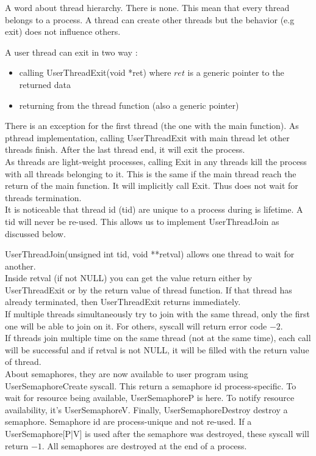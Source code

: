 A word about thread hierarchy. There is none. This mean that every thread
belongs to a process. A thread can create other threads but the behavior (e.g
exit) does not influence others.

A user thread can exit in two way :
\begin{itemize}
    \item calling \textrm{UserThreadExit(void *ret)} where $ret$ is a generic
        pointer to the returned data
    \item returning from the thread function (also a generic pointer)
\end{itemize}

There is an exception for the first thread (the one with the main function). As
pthread implementation, calling \textrm{UserThreadExit} with main thread let
other threads finish. After the last thread end, it will exit the process.\\

As threads are light-weight processes, calling \textrm{Exit} in any threads
kill the process with all threads belonging to it. This is the same if the main
thread reach the return of the main function. It will implicitly call
\textrm{Exit}. Thus does not wait for threads termination.\\

It is noticeable that thread id (tid) are unique to a process during is
lifetime. A tid will never be re-used. This allows us to implement
\textrm{UserThreadJoin} as discussed below.

\textrm{UserThreadJoin(unsigned int tid, void **retval)} allows one thread to wait for
another.\\
Inside retval (if not NULL) you can get the value return either by
\textrm{UserThreadExit} or by the return value of thread function. If that
thread has already terminated, then \textrm{UserThreadExit} returns
immediately.\\
If multiple threads simultaneously try to join with the same thread, only the
first one will be able to join on it. For others, syscall will return error
code $-2$. \\
If threads join multiple time on the same thread (not at the same time), each
call will be successful and if retval is not NULL, it will be filled with the
return value of thread.\\

About semaphores, they are now available to user program using
UserSemaphoreCreate syscall. This return a semaphore id process-specific. To
wait for resource being available, \textrm{UserSemaphoreP} is here. To notify resource
availability, it's\textrm{ UserSemaphoreV}. Finally,\textrm{ UserSemaphoreDestroy} destroy a
semaphore. Semaphore id are process-unique and not re-used. If a
UserSemaphore[P|V] is used after the semaphore was destroyed, these syscall
will return $-1$. All semaphores are destroyed at the end of a process.

